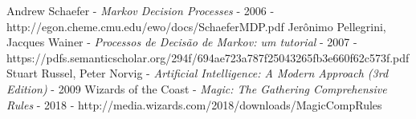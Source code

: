 \documentclass[dvipsnames]{book}
\begin{document}
\begin{thebibliography}{1}
  Andrew Schaefer - {\em Markov Decision Processes} - 2006 - http://egon.cheme.cmu.edu/ewo/docs/SchaeferMDP.pdf
  Jerônimo Pellegrini, Jacques Wainer - {\em Processos de Decisão de Markov: um tutorial} - 2007 - https://pdfs.semanticscholar.org/294f/694ae723a787f25043265fb3e660f62c573f.pdf
  Stuart Russel, Peter Norvig - {\em Artificial Intelligence: A Modern Approach (3rd Edition)} - 2009
  Wizards of the Coast - {\em Magic: The Gathering Comprehensive Rules} - 2018 - http://media.wizards.com/2018/downloads/MagicCompRules%
\end{thebibliography}
\end{document}
